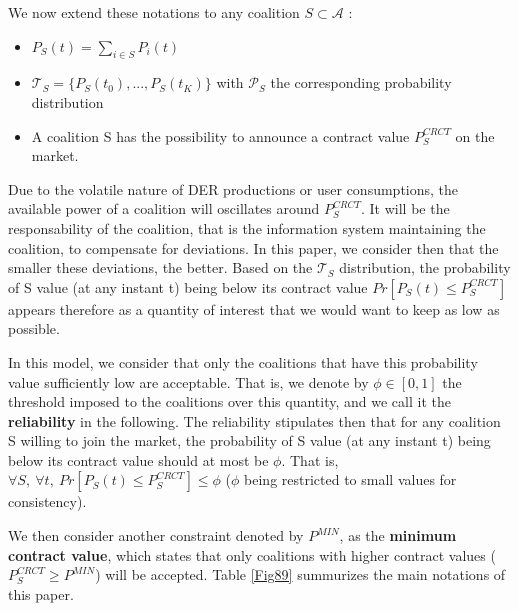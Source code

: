 \documentclass[conference]{IEEEtran}
\begin{document}
We now extend these notations to any coalition $ S \subset \mathcal{A} $ : 
\begin{itemize}
\item $ P_{S}(t) = \sum_{i \in S} P_{i}(t) $
\item $ \mathcal{T}_{S} = \{ P_{S}(t_{0}),...,P_{S}(t_{K}) \} $ with $ \mathcal{P}_{S} $ the corresponding probability distribution
\item A coalition S has the possibility to announce a contract value $ P_{S}^{CRCT} $ on the market.
\end{itemize}

Due to the volatile nature of DER productions or user consumptions, the available power of a coalition will oscillates around $ P_{S}^{CRCT} $. It will be the responsability of the coalition, that is the information system maintaining the coalition, to compensate for deviations. In this paper, we consider then that the smaller these deviations, the better. Based on the $ \mathcal{T}_{S} $ distribution, the probability of S value (at any instant t) being below its contract value $ Pr[P_{S}(t) \leq P_{S}^{CRCT} ] $ appears therefore as a quantity of interest that we would want to keep as low as possible. 

In this model, we consider that only the coalitions that have this probability value sufficiently low are acceptable. That is, we denote by $ \phi \in [0,1] $ the threshold imposed to the coalitions over this quantity, and we call it the \textbf{reliability} in the following. The reliability stipulates then that for any coalition S willing to join the market, the probability of S value (at any instant t) being below its contract value should at most be $ \phi $. That is, $ \forall S,\ \forall t,\ Pr[P_{S}(t) \leq P_{S}^{CRCT} ] \leq \phi $ ($ \phi $ being restricted to small values for consistency).

We then consider another constraint denoted by $ P^{MIN} $, as the \textbf{minimum contract value}, which states that only coalitions with higher contract values ($ P_{S}^{CRCT} \geq P^{MIN} $) will be accepted. Table \ref{Fig89} summurizes the main notations of this paper.
\end{document}
